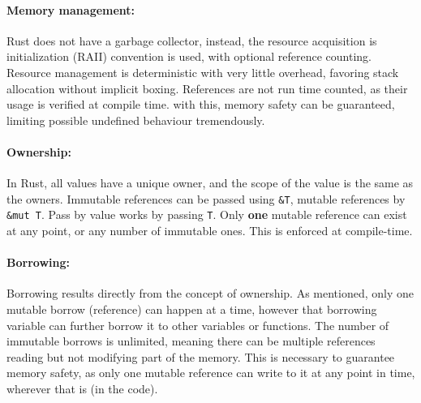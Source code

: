 \paragraph{Memory management:}\label{sec:memmanage}
Rust does not have a garbage collector, instead, the resource acquisition is
initialization (RAII) convention is used, with optional reference counting.
Resource management is deterministic with very little overhead, favoring stack
allocation without implicit boxing. References are not run time counted, as
their usage is verified at compile time. with this, memory safety can be
guaranteed, limiting possible undefined behaviour tremendously.


\paragraph{Ownership:}\label{sec:ownership}
In Rust, all values have a unique owner, and the scope of the value is the same
as the owners. Immutable references can be passed using \verb|&T|, mutable
references by \verb|&mut T|. Pass by value works by passing \verb|T|. Only
\textbf{one} mutable reference can exist at any point, or any number of
immutable ones. This is enforced at compile-time.

\paragraph{Borrowing:}\label{sec:borrowing}
Borrowing results directly from the concept of ownership. As mentioned, only one mutable
borrow (reference) can happen at a time, however that borrowing variable can
further borrow it to other variables or functions. The number of immutable
borrows is unlimited, meaning there can be multiple references reading but not
modifying part of the memory. This is necessary to guarantee memory safety, as
only one mutable reference can write to it at any point in time, wherever that
is (in the code).


